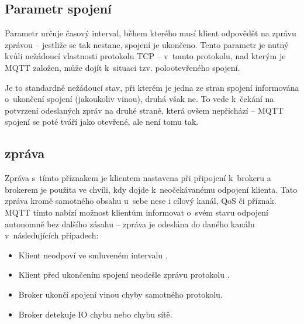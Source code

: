 \subsection{Parametr spojení }\label{subsec:parametr-spojeni-keep-alive}
Parametr  určuje časový interval, během kterého musí klient odpovědět na zprávu  zprávou
 -- jestliže se tak nestane, spojení je ukončeno.
Tento parametr je nutný kvůli nežádoucí vlastnosti protokolu TCP --
v~tomto protokolu, nad kterým je MQTT založen, může dojít k~situaci tzv. polootevřeného spojení.

Je to standardně nežádoucí stav, při kterém je jedna ze stran spojení informována o~ukončení spojení (jakoukoliv
vinou), druhá však ne.
To vede k~čekání na potvrzení odeslaných zpráv na druhé straně, která ovšem nepřichází -- MQTT spojení se poté
tváří jako otevřené, ale není tomu tak.

\subsection{ zpráva}\label{subsec:last-will-zprava}
Zpráva s~tímto příznakem je klientem nastavena při připojení k~brokeru a brokerem je použita ve chvíli, kdy dojde
k~neočekávanému odpojení klienta.
Tato zpráva  kromě samotného obsahu u~sebe nese i cílový kanál, QoS či 
příznak.
MQTT tímto nabízí možnost klientům informovat o~svém stavu odpojení autonomně bez dalšího zásahu --
 zpráva je odeslána do daného kanálu v~následujících případech:
\begin{itemize}
    \item Klient neodpoví ve smluveném intervalu .
    \item Klient před ukončením spojení neodešle zprávu protokolu .
    \item Broker ukončí spojení vinou chyby samotného protokolu.
    \item Broker detekuje IO chybu nebo chybu sítě.
\end{itemize}

